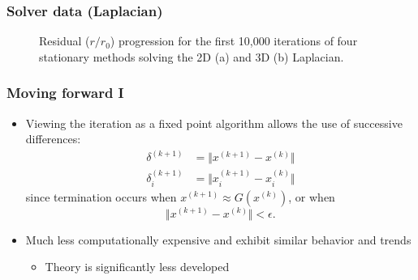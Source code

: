 \documentclass{beamer}
\begin{document}
\begin{frame}
	\frametitle{Solver data (Laplacian)}
	\begin{figure}[H]
		\centering
		\caption{Residual ($r / r_0$) progression for the first 10,000 iterations of four stationary methods solving the 2D (a) and 3D (b) Laplacian.}
	\end{figure}
\end{frame}

\begin{frame}
	\frametitle{Moving forward I}
	\begin{itemize}
		\item Viewing the iteration as a fixed point algorithm allows the use of successive differences:
				\begin{align}
					\delta^{(k+1)} &= \Vert x^{(k+1)} - x^{(k)} \Vert \\
					\delta^{(k+1)}_i &= \Vert x^{(k+1)}_i - x^{(k)}_i \Vert 
				\end{align}
			since termination occurs when $x^{(k+1)} \approx G \left( x^{(k)} \right)$, or when
				\begin{equation}
					\Vert x^{(k+1)} - x^{(k)} \Vert < \epsilon.
				\end{equation}
		\item Much less computationally expensive and exhibit similar behavior and trends
			\begin{itemize}
				\item Theory is significantly less developed
			\end{itemize}
	\end{itemize}
\end{frame}
\end{document}
